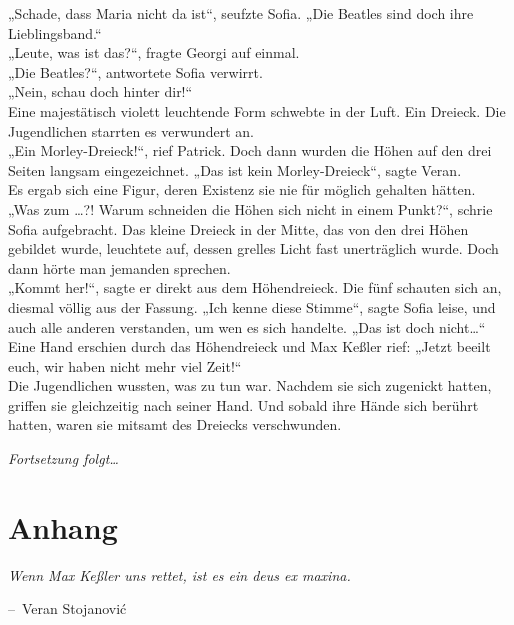 \documentclass[oneside]{memoir}
\makeatletter
\newenvironment{chapquote}[2][2em]
  {\setlength{\@tempdima}{#1}%
   \def\chapquote@author{#2}%
   \parshape 1 \@tempdima \dimexpr\textwidth-2\@tempdima\relax%
   \itshape}
  {\par\normalfont\hfill--\ \chapquote@author\hspace*{\@tempdima}\par\bigskip}
\makeatother
\begin{document}
„Schade, dass Maria nicht da ist“, seufzte Sofia. „Die Beatles sind doch ihre Lieblingsband.“ \\
„Leute, was ist das?“, fragte Georgi auf einmal. \\
„Die Beatles?“, antwortete Sofia verwirrt. \\
„Nein, schau doch hinter dir!“ \\
Eine majestätisch violett leuchtende Form schwebte in der Luft. Ein Dreieck. Die Jugendlichen starrten es verwundert an. \\
„Ein Morley-Dreieck!“, rief Patrick. Doch dann wurden die Höhen auf den drei Seiten langsam eingezeichnet.
„Das ist kein Morley-Dreieck“, sagte Veran. \\
Es ergab sich eine Figur, deren Existenz sie nie für möglich gehalten hätten. \\
„Was zum \ldots?! Warum schneiden die Höhen sich nicht in einem Punkt?“, schrie Sofia aufgebracht. Das kleine Dreieck in der Mitte, das von den drei Höhen gebildet wurde, leuchtete auf, dessen grelles Licht fast unerträglich wurde. Doch dann hörte man jemanden sprechen. \\
„Kommt her!“, sagte er direkt aus dem Höhendreieck. Die fünf schauten sich an, diesmal völlig aus der Fassung.
„Ich kenne diese Stimme“, sagte Sofia leise, und auch alle anderen verstanden, um wen es sich handelte. „Das ist doch nicht\ldots“ \\
Eine Hand erschien durch das Höhendreieck und Max Keßler rief: „Jetzt beeilt euch, wir haben nicht mehr viel Zeit!“ \\
Die Jugendlichen wussten, was zu tun war. Nachdem sie sich zugenickt hatten, griffen sie gleichzeitig nach seiner Hand. Und sobald ihre Hände sich berührt hatten, waren sie mitsamt des Dreiecks verschwunden.
\newpage
\thispagestyle{empty}
\begin{center}
\textit{Fortsetzung folgt\ldots}
\end{center}

\chapter{Anhang}
\begin{chapquote}{Veran Stojanović}
\glqq Wenn Max Keßler uns rettet, ist es ein deus ex maxina.\grqq
\end{chapquote}
\end{document}
